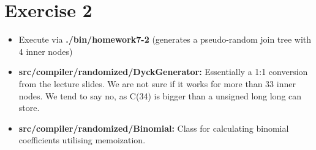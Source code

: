 \documentclass[paper=a4, fontsize=11pt]{scrartcl} %
\numberwithin{equation}{section} %
\numberwithin{figure}{section} %
\numberwithin{table}{section} %
\begin{document}
\section{Exercise 2}
	\begin{itemize}
		\item Execute via \textbf{./bin/homework7-2} (generates a pseudo-random join tree with 4 inner nodes)
		\item \textbf{src/compiler/randomized/DyckGenerator:} Essentially a 1:1 conversion from the lecture slides. We are not sure if it works for more  than 33 inner nodes. We tend to say no, as C(34) is bigger than a unsigned long long can store.
		\item \textbf{src/compiler/randomized/Binomial:} Class for calculating binomial coefficients utilising memoization.
	\end{itemize}
\end{document}
